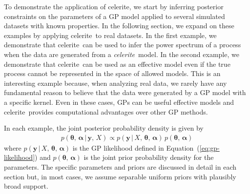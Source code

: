 \documentclass[manuscript, letterpaper]{aastex6}
\makeatletter
\let\origsubsection\subsection
\renewcommand\subsection{\@ifstar{\starsubsection}{\nostarsubsection}}
\newcommand\nostarsubsection[1]{\subsectionprelude\origsubsection{#1}}
\newcommand\starsubsection[1]{\subsectionprelude\origsubsection*{#1}}
\newcommand\subsectionprelude{\vspace{1em}}
\newcommand{\project}[1]{\textsf{#1}}
\newcommand{\celerite}{\project{celerite}}
\newcommand{\celeriteterm}{\emph{celerite}}
\renewcommand{\eqref}[1]{\ref{eq:#1}}
\newcommand{\Eq}[1]{Equation~(\eqref{#1})}
\newcommand{\eq}[1]{\Eq{#1}}
\newcommand{\eqlabel}[1]{\label{eq:#1}}
\newcommand{\bvec}[1]{{\ensuremath{\boldsymbol{#1}}}}
\newcommand{\response}[1]{{\color{blue}#1}}
\makeatother
\begin{document}
To demonstrate the application of \celerite, we start by inferring
posterior constraints on the parameters of a GP model applied to several
simulated datasets with known properties.
In the following section, we expand on these examples by applying
\celerite\ to real datasets.
In the first example, we demonstrate that \celerite\ can be used to infer
the power spectrum of a process when the data are generated from a
\celeriteterm\ model.
In the second example, we demonstrate that \celerite\ can be used as an
effective model even if the true process cannot be represented in the space of
allowed models.
This is an interesting example because, when analyzing real data, we rarely
have any fundamental reason to believe that the data were generated by a GP
model with a specific kernel.
Even in these cases, GPs can be useful effective models and \celerite\
provides computational advantages over other GP methods.

\response{In each example, the joint posterior probability density is given by
\begin{eqnarray}\eqlabel{joint-post}
p(\bvec{\theta},\,\bvec{\alpha}\,|\,\bvec{y},\,X) \propto
p(\bvec{y}\,|\,{X,\,\bvec{\theta}},\,\bvec{\alpha})\,
p(\bvec{\theta},\,\bvec{\alpha})
\end{eqnarray}
where $p(\bvec{y}\,|\,{X,\,\bvec{\theta}},\,\bvec{\alpha})$ is the GP
likelihood defined in \eq{gp-likelihood} and
$p(\bvec{\theta},\,\bvec{\alpha})$ is the joint prior probability density for
the parameters.
The specific parameters and priors are discussed in detail in each section
but, in most cases, we assume separable uniform priors with plausibly broad
support.
}

\subsection{Recovery of a celerite process}
\end{document}
